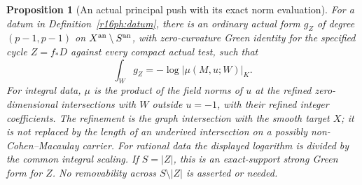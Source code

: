 \documentclass[11pt,a4paper]{article}
\newtheorem{proposition}[theorem]{Proposition}
\theoremstyle{definition}
\theoremstyle{remark}
\numberwithin{equation}{section}
\begin{document}
\begin{proposition}[An actual principal push with its exact norm evaluation]
\label{r16ph:principal-push}
For a datum in Definition~\ref{r16ph:datum}, there is an ordinary
actual form $g_Z$ of degree $(p-1,p-1)$ on
$X^{\rm an}\setminus S^{\rm an}$, with zero-curvature Green
identity for the specified cycle $Z=f_*D$ against every compact
actual test, such that
\[
                \int_W g_Z=-\log|\mu(M,u;W)|_K.
 \tag{PH16.2}\label{r16ph:norm-evaluation}
\]
For integral data, $\mu$ is the product of the field norms of $u$
at the refined zero-dimensional intersections with $W$ outside
$u=-1$, with their refined integer coefficients.  The refinement
is the graph intersection with the smooth target $X$; it is not
replaced by the length of an underived intersection on a possibly
non-Cohen--Macaulay carrier.  For rational data the displayed
logarithm is divided by the common integral scaling.
If $S=|Z|$, this is an exact-support strong Green form for $Z$.
No removability across $S\setminus|Z|$ is asserted or needed.
\end{proposition}
\end{document}
